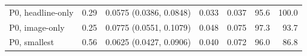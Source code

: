 \begin{tabular}{lrrrrrr}
P0, headline-only & 0.29 & 0.0575 (0.0386, 0.0848) & 0.033 & 0.037 & 95.6 & 100.0 \\
P0, image-only & 0.25 & 0.0775 (0.0551, 0.1079) & 0.048 & 0.075 & 97.3 & 93.7 \\
P0, smallest & 0.56 & 0.0625 (0.0427, 0.0906) & 0.040 & 0.072 & 96.0 & 86.8 \\
\midrule

\end{tabular}
